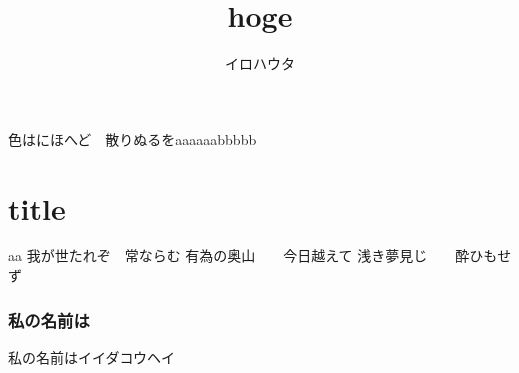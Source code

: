 \documentclass{ujarticle}
\title{hoge}
\author{イロハウタ}
\begin{document}
\maketitle

色はにほへど　散りぬるをaaaaaabbbbb\part{title}aa
我が世たれぞ　常ならむ
有為の奥山　　今日越えて
浅き夢見じ　　酔ひもせず

\newpage
\section{私の名前は}
私の名前はイイダコウヘイ
\end{document}
